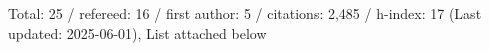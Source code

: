Total: 25 / refereed: 16 / first author: 5 / citations: 2,485 / h-index: 17 (Last updated: 2025-06-01), List attached below